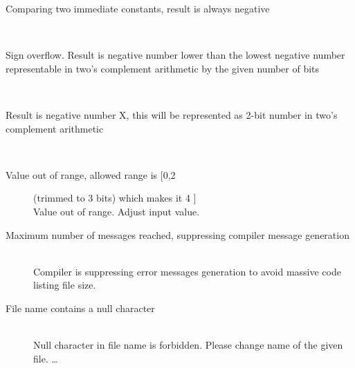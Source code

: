 \begin{description}
                    \item[Comparing two immediate constants, result is always negative] \hfill \\

                    \item[Sign overflow. Result is negative number lower than the lowest negative number representable in two's complement arithmetic by the given number of bits ] \hfill \\

                    \item[Result is negative number X, this will be represented as 2-bit number in two's complement arithmetic] \hfill \\

                    \item[Value out of range, allowed range is [0,2] (trimmed to 3 bits) which makes it 4 ] \hfill \\
                    Value out of range. Adjust input value.                                                     %
                    \item[Maximum number of messages reached, suppressing compiler message generation ] \hfill \\
                    Compiler is suppressing error messages generation to avoid massive code listing file size.
                    \item[File name contains a null character ] \hfill \\
                    Null character in file name is forbidden. Please change name of the given file.
                    \ldots
                    \end{description}

